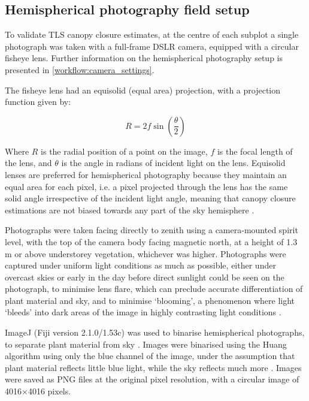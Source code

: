 \begin{refsection}
\section{Hemispherical photography field setup}
\label{workflow:sec:hemi_field}

To validate TLS canopy closure estimates, at the centre of each subplot a single photograph was taken with a full-frame DSLR camera, equipped with a circular fisheye lens. Further information on the hemispherical photography setup is presented in \autoref{workflow:camera_settings}.

The fisheye lens had an equisolid (equal area) projection, with a projection function given by: 

\begin{equation}
	R = 2f \sin{(\frac{\theta{}}{2})}
\end{equation}

Where $R$ is the radial position of a point on the image, $f$ is the focal length of the lens, and $\theta{}$ is the angle in radians of incident light on the lens. Equisolid lenses are preferred for hemispherical photography because they maintain an equal area for each pixel, i.e. a pixel projected through the lens has the same solid angle irrespective of the incident light angle, meaning that canopy closure estimations are not biased towards any part of the sky hemisphere \citep{Herbert1987}.

Photographs were taken facing directly to zenith using a camera-mounted spirit level, with the top of the camera body facing magnetic north, at a height of 1.3 m or above understorey vegetation, whichever was higher. Photographs were captured under uniform light conditions as much as possible, either under overcast skies or early in the day before direct sunlight could be seen on the photograph, to minimise lens flare, which can preclude accurate differentiation of plant material and sky, and to minimise `blooming', a phenomenon where light `bleeds' into dark areas of the image in highly contrasting light conditions \citep{Frazer2001}.

ImageJ (Fiji version 2.1.0/1.53c) was used to binarise hemispherical photographs, to separate plant material from sky \citep{Schneider2012}. Images were binarised using the Huang algorithm \citep{Huang1995} using only the blue channel of the image, under the assumption that plant material reflects little blue light, while the sky reflects much more \citep{Brusa2014}. Images were saved as PNG files at the original pixel resolution, with a circular image of 4016$\times$4016 pixels.


\end{refsection}
